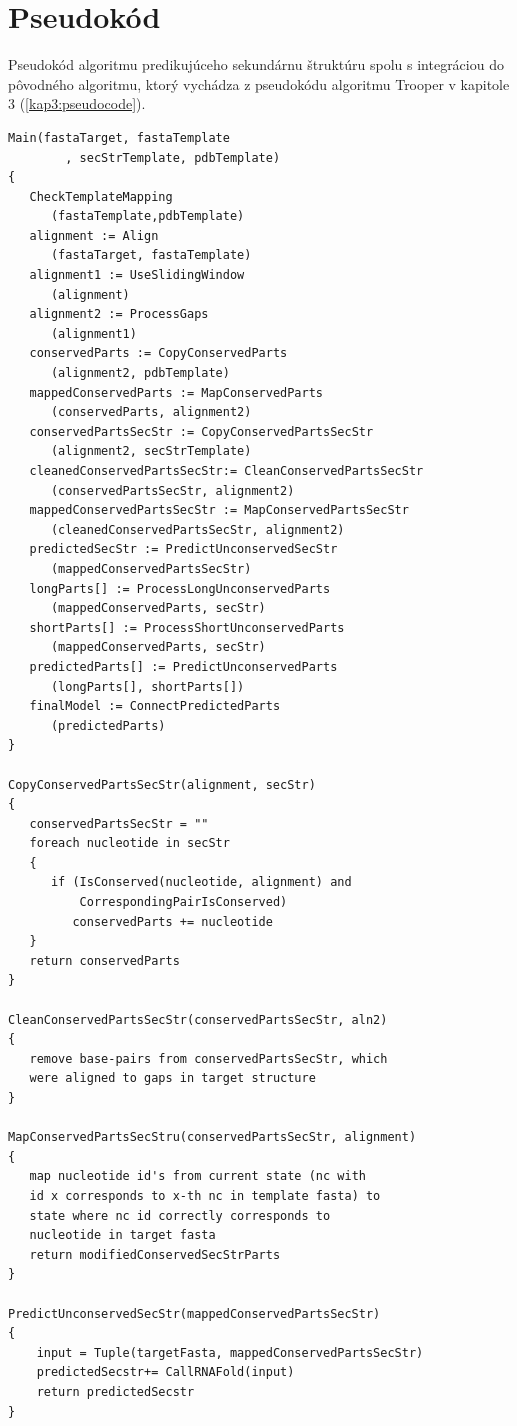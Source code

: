 \section{Pseudokód}\label{kap5:pseudocode}
 Pseudokód algoritmu predikujúceho sekundárnu štruktúru spolu s integráciou do pôvodného algoritmu, ktorý vychádza z pseudokódu algoritmu Trooper v kapitole 3 (\autoref{kap3:pseudocode}).
\lstset{numbers=left, numberstyle=\tiny, stepnumber=1, numbersep=5pt}
\begin{lstlisting}
Main(fastaTarget, fastaTemplate
        , secStrTemplate, pdbTemplate)
{
   CheckTemplateMapping
      (fastaTemplate,pdbTemplate)
   alignment := Align
      (fastaTarget, fastaTemplate)
   alignment1 := UseSlidingWindow
      (alignment)
   alignment2 := ProcessGaps
      (alignment1)
   conservedParts := CopyConservedParts
      (alignment2, pdbTemplate)
   mappedConservedParts := MapConservedParts
      (conservedParts, alignment2)
   conservedPartsSecStr := CopyConservedPartsSecStr
      (alignment2, secStrTemplate)
   cleanedConservedPartsSecStr:= CleanConservedPartsSecStr
      (conservedPartsSecStr, alignment2)
   mappedConservedPartsSecStr := MapConservedPartsSecStr
      (cleanedConservedPartsSecStr, alignment2)
   predictedSecStr := PredictUnconservedSecStr
      (mappedConservedPartsSecStr)
   longParts[] := ProcessLongUnconservedParts
      (mappedConservedParts, secStr)
   shortParts[] := ProcessShortUnconservedParts
      (mappedConservedParts, secStr)
   predictedParts[] := PredictUnconservedParts
      (longParts[], shortParts[])
   finalModel := ConnectPredictedParts
      (predictedParts)
}

CopyConservedPartsSecStr(alignment, secStr)
{
   conservedPartsSecStr = ""
   foreach nucleotide in secStr 
   {
      if (IsConserved(nucleotide, alignment) and
          CorrespondingPairIsConserved)
         conservedParts += nucleotide
   }
   return conservedParts
}

CleanConservedPartsSecStr(conservedPartsSecStr, aln2)
{
   remove base-pairs from conservedPartsSecStr, which 
   were aligned to gaps in target structure
}

MapConservedPartsSecStru(conservedPartsSecStr, alignment)
{
   map nucleotide id's from current state (nc with
   id x corresponds to x-th nc in template fasta) to 
   state where nc id correctly corresponds to 
   nucleotide in target fasta 
   return modifiedConservedSecStrParts
}

PredictUnconservedSecStr(mappedConservedPartsSecStr)
{
    input = Tuple(targetFasta, mappedConservedPartsSecStr)
    predictedSecstr+= CallRNAFold(input)
    return predictedSecstr
}


\end{lstlisting}
